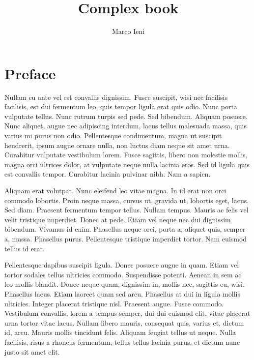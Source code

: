 \documentclass[11pt, a4paper]{article} %
\title{Complex book}
\author{Marco Ieni}
\begin{document}
\maketitle
\thispagestyle{empty}
\newpage

\tableofcontents
\newpage
\section*{Preface}

Nullam eu ante vel est convallis dignissim.  Fusce suscipit, wisi nec facilisis facilisis, est dui fermentum leo, quis tempor ligula erat quis odio.  Nunc porta vulputate tellus.  Nunc rutrum turpis sed pede.  Sed bibendum.  Aliquam posuere.  Nunc aliquet, augue nec adipiscing interdum, lacus tellus malesuada massa, quis varius mi purus non odio.  Pellentesque condimentum, magna ut suscipit hendrerit, ipsum augue ornare nulla, non luctus diam neque sit amet urna.  Curabitur vulputate vestibulum lorem.  Fusce sagittis, libero non molestie mollis, magna orci ultrices dolor, at vulputate neque nulla lacinia eros.  Sed id ligula quis est convallis tempor.  Curabitur lacinia pulvinar nibh.  Nam a sapien.

Aliquam erat volutpat.  Nunc eleifend leo vitae magna.  In id erat non orci commodo lobortis.  Proin neque massa, cursus ut, gravida ut, lobortis eget, lacus.  Sed diam.  Praesent fermentum tempor tellus.  Nullam tempus.  Mauris ac felis vel velit tristique imperdiet.  Donec at pede.  Etiam vel neque nec dui dignissim bibendum.  Vivamus id enim.  Phasellus neque orci, porta a, aliquet quis, semper a, massa.  Phasellus purus.  Pellentesque tristique imperdiet tortor.  Nam euismod tellus id erat.

Pellentesque dapibus suscipit ligula.  Donec posuere augue in quam.  Etiam vel tortor sodales tellus ultricies commodo.  Suspendisse potenti.  Aenean in sem ac leo mollis blandit.  Donec neque quam, dignissim in, mollis nec, sagittis eu, wisi.  Phasellus lacus.  Etiam laoreet quam sed arcu.  Phasellus at dui in ligula mollis ultricies.  Integer placerat tristique nisl.  Praesent augue.  Fusce commodo.  Vestibulum convallis, lorem a tempus semper, dui dui euismod elit, vitae placerat urna tortor vitae lacus.  Nullam libero mauris, consequat quis, varius et, dictum id, arcu.  Mauris mollis tincidunt felis.  Aliquam feugiat tellus ut neque.  Nulla facilisis, risus a rhoncus fermentum, tellus tellus lacinia purus, et dictum nunc justo sit amet elit.
\end{document}
